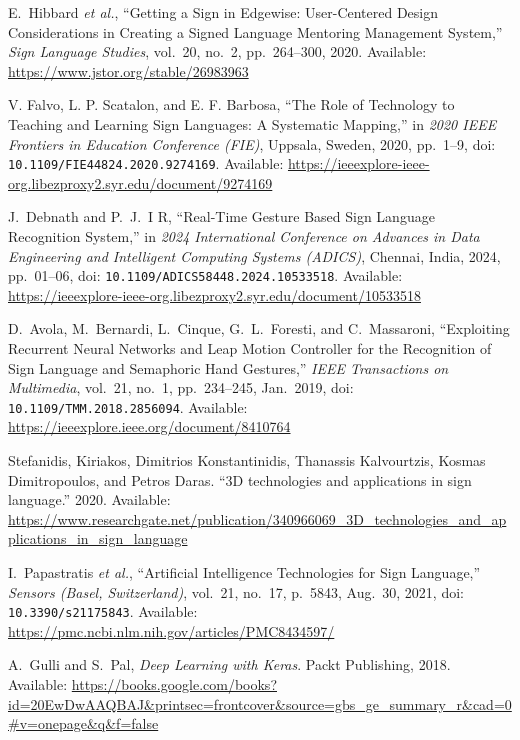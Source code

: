 \documentclass[12pt]{article}
\begin{document}
\begin{thebibliography}{99}

E.~Hibbard \emph{et al.}, 
“Getting a Sign in Edgewise: User-Centered Design Considerations in Creating a Signed Language Mentoring Management System,” 
\emph{Sign Language Studies}, vol.~20, no.~2, pp.~264--300, 2020. 
Available: \url{https://www.jstor.org/stable/26983963}  

V. Falvo, L. P. Scatalon, and E. F. Barbosa, 
“The Role of Technology to Teaching and Learning Sign Languages: A Systematic Mapping,” 
in \emph{2020 IEEE Frontiers in Education Conference (FIE)}, Uppsala, Sweden, 2020, pp.~1--9, 
doi: \texttt{10.1109/FIE44824.2020.9274169}.  
Available: \url{https://ieeexplore-ieee-org.libezproxy2.syr.edu/document/9274169}

J.~Debnath and P.~J.~I R, 
“Real-Time Gesture Based Sign Language Recognition System,” 
in \emph{2024 International Conference on Advances in Data Engineering and Intelligent Computing Systems (ADICS)}, 
Chennai, India, 2024, pp.~01--06, 
doi: \texttt{10.1109/ADICS58448.2024.10533518}.
Available: \url{https://ieeexplore-ieee-org.libezproxy2.syr.edu/document/10533518}

D.~Avola, M.~Bernardi, L.~Cinque, G.~L.~Foresti, and C.~Massaroni, 
“Exploiting Recurrent Neural Networks and Leap Motion Controller for the Recognition of Sign Language and Semaphoric Hand Gestures,” 
\emph{IEEE Transactions on Multimedia}, vol.~21, no.~1, pp.~234--245, Jan.~2019, 
doi: \texttt{10.1109/TMM.2018.2856094}. 
Available: \url{https://ieeexplore.ieee.org/document/8410764}

Stefanidis, Kiriakos, Dimitrios Konstantinidis, Thanassis Kalvourtzis,  
Kosmas Dimitropoulos, and Petros Daras.  
“3D technologies and applications in sign language.” 2020. 
Available: \url{https://www.researchgate.net/publication/340966069_3D_technologies_and_applications_in_sign_language}

I.~Papastratis \emph{et al.}, 
“Artificial Intelligence Technologies for Sign Language,” 
\emph{Sensors (Basel, Switzerland)}, vol.~21, no.~17, p.~5843, Aug.~30, 2021, 
doi: \texttt{10.3390/s21175843}.   
Available: \url{https://pmc.ncbi.nlm.nih.gov/articles/PMC8434597/}

A.~Gulli and S.~Pal, 
\emph{Deep Learning with Keras}. 
Packt Publishing, 2018. 
Available: \url{https://books.google.com/books?id=20EwDwAAQBAJ&printsec=frontcover&source=gbs_ge_summary_r&cad=0#v=onepage&q&f=false}



\end{thebibliography}
\end{document}
